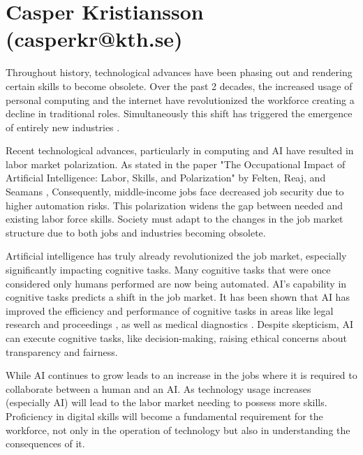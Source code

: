 \documentclass[12pt]{article}
\begin{document}
\section{Casper Kristiansson (casperkr@kth.se)}
{
\setlength\parindent{0pt}   %
\setlength{\parskip}{\bigskipamount}    %
Throughout history, technological advances have been phasing out and rendering certain skills to become obsolete. Over the past 2 decades, the increased usage of personal computing and the internet have revolutionized the workforce creating a decline in traditional roles. Simultaneously this shift has triggered the emergence of entirely new industries \cite{frey2017future}.

Recent technological advances, particularly in computing and AI have resulted in labor market polarization. As stated in the paper "The Occupational Impact of Artificial Intelligence: Labor, Skills, and Polarization" by Felten, Reaj, and Seamans \cite{felten2019occupational},  Consequently, middle-income jobs face decreased job security due to higher automation risks. This polarization widens the gap between needed and existing labor force skills. Society must adapt to the changes in the job market structure due to both jobs and industries becoming obsolete.

Artificial intelligence has truly already revolutionized the job market, especially significantly impacting cognitive tasks. Many cognitive tasks that were once considered only humans performed are now being automated. AI's capability in cognitive tasks predicts a shift in the job market. It has been shown that AI has improved the efficiency and performance of cognitive tasks in areas like legal research and proceedings \cite{katz2017general}, as well as medical diagnostics \cite{esteva2017dermatologist}. Despite skepticism, AI can execute cognitive tasks, like decision-making, raising ethical concerns about transparency and fairness.

While AI continues to grow leads to an increase in the jobs where it is required to collaborate between a human and an AI. As technology usage increases (especially AI) will lead to the labor market needing to possess more skills. Proficiency in digital skills will become a fundamental requirement for the workforce, not only in the operation of technology but also in understanding the consequences of it.

}
\end{document}
